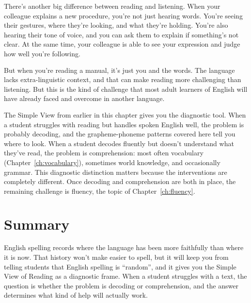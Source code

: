 There's another big difference between reading and listening. When your colleague explains a new procedure, you're not just hearing words. You're seeing their gestures, where they're looking, and what they're holding. You're also hearing their tone of voice, and you can ask them to explain if something's not clear. At the same time, your colleague is able to see your expression and judge how well you're following.

But when you're reading a manual, it's just you and the words. The language lacks extra-linguistic context, and that can make reading more challenging than listening. But this is the kind of challenge that most adult learners of English will have already faced and overcome in another language.

The Simple View from earlier in this chapter gives you the diagnostic tool. When a student struggles with reading but handles spoken English well, the problem is probably decoding, and the grapheme-phoneme patterns covered here tell you where to look. When a student decodes fluently but doesn't understand what they've read, the problem is comprehension: most often vocabulary (Chapter~\ref{ch:vocabulary}), sometimes world knowledge, and occasionally grammar. This diagnostic distinction matters because the interventions are completely different. Once decoding and comprehension are both in place, the remaining challenge is fluency, the topic of Chapter~\ref{ch:fluency}.

\section{Summary}

English spelling records where the language has been more faithfully than where it is now. That history won't make  easier to spell, but it will keep you from telling students that English spelling is \enquote{random}, and it gives you the Simple View of Reading as a diagnostic frame. When a student struggles with a text, the question is whether the problem is decoding or comprehension, and the answer determines what kind of help will actually work.

